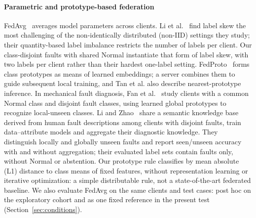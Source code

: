 \documentclass[conference]{IEEEtran}
\begin{document}
\paragraph{Parametric and prototype-based federation}
\mbox{FedAvg}~\cite{mcmahan2017fedavg} averages model parameters across clients. Li et al.~\cite{li2022noniid} find label skew the most challenging of the non-identically distributed (non-IID) settings they study; their quantity-based label imbalance restricts the number of labels per client. Our class-disjoint faults with shared Normal instantiate that form of label skew, with two labels per client rather than their hardest one-label setting. FedProto~\cite{tan2022fedproto} forms class prototypes as means of learned embeddings; a server combines them to guide subsequent local training, and Tan et al. also describe nearest-prototype inference. In mechanical fault diagnosis, Fan et al.~\cite{fan2025prototype} study clients with a common Normal class and disjoint fault classes, using learned global prototypes to recognize local-unseen classes. Li and Zhao~\cite{li2023fedzsl} share a semantic knowledge base derived from human fault descriptions among clients with disjoint faults, train data--attribute models and aggregate their diagnostic knowledge. They distinguish locally and globally unseen faults and report seen/unseen accuracy with and without aggregation; their evaluated label sets contain faults only, without Normal or abstention. Our prototype rule classifies by mean absolute (L1) distance to class means of fixed features, without representation learning or iterative optimization: a simple distributable rule, not a state-of-the-art federated baseline. We also evaluate FedAvg on the same clients and test cases: post hoc on the exploratory cohort and as one fixed reference in the present test (Section~\ref{sec:conditions}).
\end{document}
